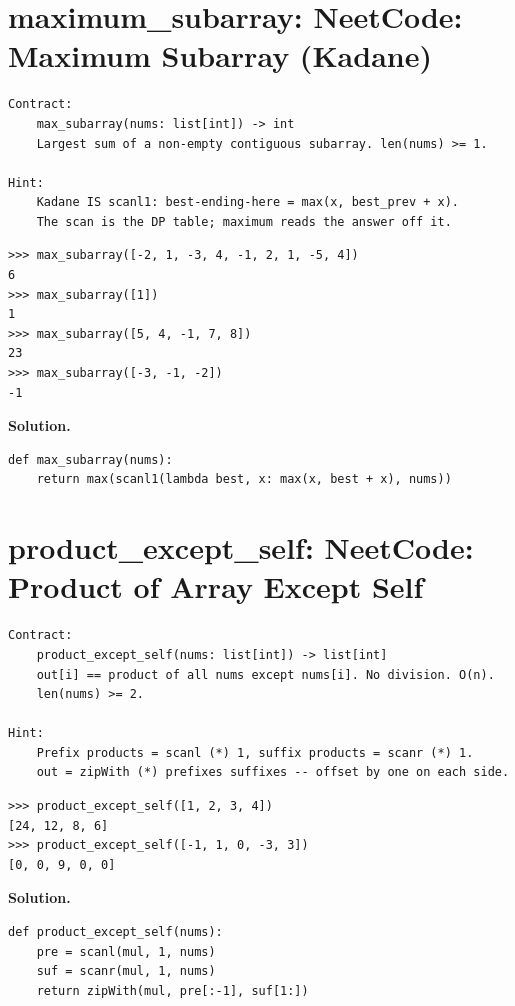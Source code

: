 \documentclass[10pt,letterpaper]{book}
\begin{document}
\section{maximum\_subarray: NeetCode: Maximum Subarray (Kadane)}
\begin{lstlisting}[style=ex]
Contract:
    max_subarray(nums: list[int]) -> int
    Largest sum of a non-empty contiguous subarray. len(nums) >= 1.

Hint:
    Kadane IS scanl1: best-ending-here = max(x, best_prev + x).
    The scan is the DP table; maximum reads the answer off it.
\end{lstlisting}
\begin{lstlisting}[style=ex]
>>> max_subarray([-2, 1, -3, 4, -1, 2, 1, -5, 4])
6
>>> max_subarray([1])
1
>>> max_subarray([5, 4, -1, 7, 8])
23
>>> max_subarray([-3, -1, -2])
-1
\end{lstlisting}
\noindent\textbf{Solution.}
\begin{lstlisting}[style=code]
def max_subarray(nums):
    return max(scanl1(lambda best, x: max(x, best + x), nums))
\end{lstlisting}

\section{product\_except\_self: NeetCode: Product of Array Except Self}
\begin{lstlisting}[style=ex]
Contract:
    product_except_self(nums: list[int]) -> list[int]
    out[i] == product of all nums except nums[i]. No division. O(n).
    len(nums) >= 2.

Hint:
    Prefix products = scanl (*) 1, suffix products = scanr (*) 1.
    out = zipWith (*) prefixes suffixes -- offset by one on each side.
\end{lstlisting}
\begin{lstlisting}[style=ex]
>>> product_except_self([1, 2, 3, 4])
[24, 12, 8, 6]
>>> product_except_self([-1, 1, 0, -3, 3])
[0, 0, 9, 0, 0]
\end{lstlisting}
\noindent\textbf{Solution.}
\begin{lstlisting}[style=code]
def product_except_self(nums):
    pre = scanl(mul, 1, nums)
    suf = scanr(mul, 1, nums)
    return zipWith(mul, pre[:-1], suf[1:])
\end{lstlisting}
\end{document}
